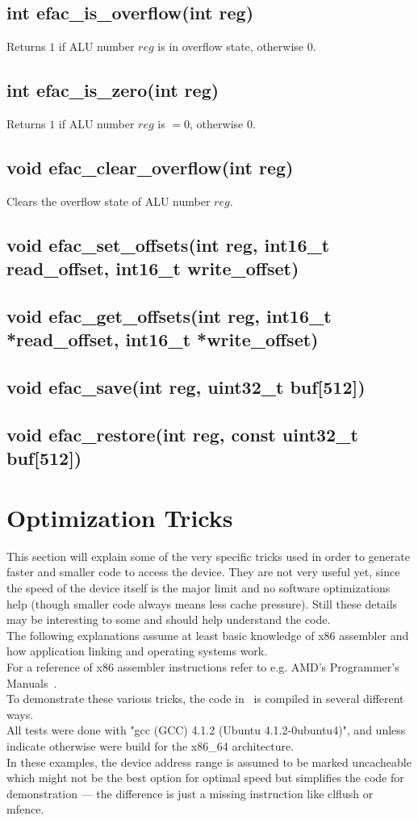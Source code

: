 \subsection{int efac\_is\_overflow(int reg)}
Returns $1$ if ALU number $reg$ is in overflow state, otherwise $0$.
\subsection{int efac\_is\_zero(int reg)}
Returns $1$ if ALU number $reg$ is $= 0$, otherwise $0$.
\subsection{void efac\_clear\_overflow(int reg)}
Clears the overflow state of ALU number $reg$.
\subsection{void efac\_set\_offsets(int reg, int16\_t read\_offset, int16\_t write\_offset)}
\subsection{void efac\_get\_offsets(int reg, int16\_t *read\_offset, int16\_t *write\_offset)}
\subsection{void efac\_save(int reg, uint32\_t buf[512])}
\subsection{void efac\_restore(int reg, const uint32\_t buf[512])}
\section{Optimization Tricks}
This section will explain some of the very specific tricks used in
order to generate faster and smaller code to access the device.
They are not very useful yet, since the speed of the device itself
is the major limit and no software optimizations help (though smaller
code always means less cache pressure).
Still these details may be interesting to some and should help
understand the code.\\
The following explanations assume at least basic knowledge of x86
assembler and how application linking and operating systems work.\\
For a reference of x86 assembler instructions refer to e.g. AMD's
Programmer's Manuals~\cite{amdinstr}.\\
To demonstrate these various tricks, the code in~
is compiled in several different ways.\\
All tests were done with "gcc (GCC) 4.1.2 (Ubuntu 4.1.2-0ubuntu4)",
and unless indicate otherwise were build for the x86\_64 architecture.\\
In these examples, the device address range is assumed to be marked
uncacheable which might not be the best option for optimal speed but
simplifies the code for demonstration --- the difference is just a
missing instruction like clflush or mfence.\\


